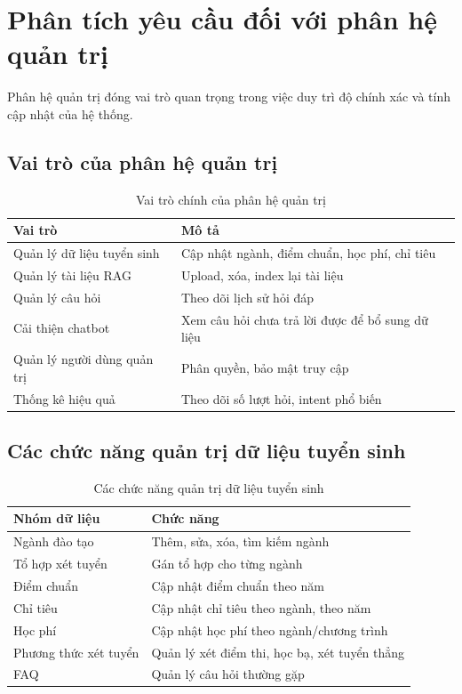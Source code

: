 \section{Phân tích yêu cầu đối với phân hệ quản trị}

Phân hệ quản trị đóng vai trò quan trọng trong việc duy trì độ chính xác và tính cập nhật của hệ thống.

\subsection{Vai trò của phân hệ quản trị}
\begin{table}[H]
\centering
\caption{Vai trò chính của phân hệ quản trị}
\label{tab:admin_module_roles}
\begin{tabular}{|p{4cm}|p{8cm}|}
\hline
\textbf{Vai trò} & \textbf{Mô tả} \\ \hline
Quản lý dữ liệu tuyển sinh & Cập nhật ngành, điểm chuẩn, học phí, chỉ tiêu \\ \hline
Quản lý tài liệu RAG & Upload, xóa, index lại tài liệu \\ \hline
Quản lý câu hỏi & Theo dõi lịch sử hỏi đáp \\ \hline
Cải thiện chatbot & Xem câu hỏi chưa trả lời được để bổ sung dữ liệu \\ \hline
Quản lý người dùng quản trị & Phân quyền, bảo mật truy cập \\ \hline
Thống kê hiệu quả & Theo dõi số lượt hỏi, intent phổ biến \\ \hline
\end{tabular}
\end{table}

\subsection{Các chức năng quản trị dữ liệu tuyển sinh}
\begin{table}[H]
\centering
\caption{Các chức năng quản trị dữ liệu tuyển sinh}
\label{tab:admin_data_functions}
\begin{tabular}{|p{4cm}|p{8cm}|}
\hline
\textbf{Nhóm dữ liệu} & \textbf{Chức năng} \\ \hline
Ngành đào tạo & Thêm, sửa, xóa, tìm kiếm ngành \\ \hline
Tổ hợp xét tuyển & Gán tổ hợp cho từng ngành \\ \hline
Điểm chuẩn & Cập nhật điểm chuẩn theo năm \\ \hline
Chỉ tiêu & Cập nhật chỉ tiêu theo ngành, theo năm \\ \hline
Học phí & Cập nhật học phí theo ngành/chương trình \\ \hline
Phương thức xét tuyển & Quản lý xét điểm thi, học bạ, xét tuyển thẳng \\ \hline
FAQ & Quản lý câu hỏi thường gặp \\ \hline
\end{tabular}
\end{table}

